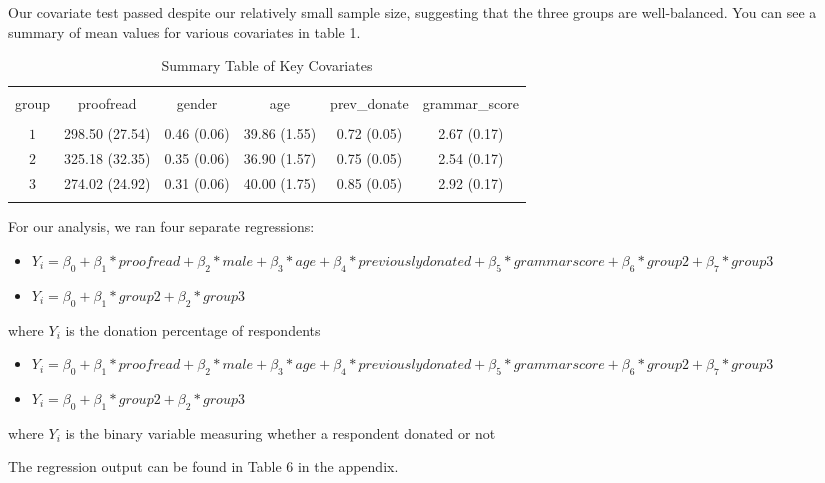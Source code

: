 \documentclass[]{article}
\providecommand{\tightlist}{%
  \setlength{\itemsep}{0pt}\setlength{\parskip}{0pt}}
\begin{document}
Our covariate test passed despite our relatively small sample size,
suggesting that the three groups are well-balanced. You can see a
summary of mean values for various covariates in table 1.

\begin{table}[!htbp] \centering 
  \caption{Summary Table of Key Covariates} 
  \label{} 
\begin{tabular}{@{\extracolsep{5pt}} cccccc} 
\\[-1.8ex]\hline 
\hline \\[-1.8ex] 
group & proofread & gender & age & prev\_donate & grammar\_score \\ 
\hline \\[-1.8ex] 
$1$ & 298.50 (27.54) & 0.46 (0.06) & 39.86 (1.55) & 0.72 (0.05) & 2.67 (0.17) \\ 
$2$ & 325.18 (32.35) & 0.35 (0.06) & 36.90 (1.57) & 0.75 (0.05) & 2.54 (0.17) \\ 
$3$ & 274.02 (24.92) & 0.31 (0.06) & 40.00 (1.75) & 0.85 (0.05) & 2.92 (0.17) \\ 
\hline \\[-1.8ex] 
\end{tabular} 
\end{table}

For our analysis, we ran four separate regressions:

\begin{itemize}
\tightlist
\item
  \(Y_i = \beta_0 + \beta_1 *proofread + \beta_2 *male + \beta_3 *age + \beta_4 *previouslydonated + \beta_5 *grammarscore + \beta_6 *group2 + \beta_7 *group3\)
\item
  \(Y_i = \beta_0 + \beta_1 *group2 + \beta_2 *group3\)
\end{itemize}

where \(Y_i\) is the donation percentage of respondents

\begin{itemize}
\tightlist
\item
  \(Y_i = \beta_0 + \beta_1 *proofread + \beta_2 *male + \beta_3 *age + \beta_4 *previouslydonated + \beta_5 *grammarscore + \beta_6 *group2 + \beta_7 *group3\)
\item
  \(Y_i = \beta_0 + \beta_1 *group2 + \beta_2 *group3\)
\end{itemize}

where \(Y_i\) is the binary variable measuring whether a respondent
donated or not

The regression output can be found in Table 6 in the appendix.
\end{document}
